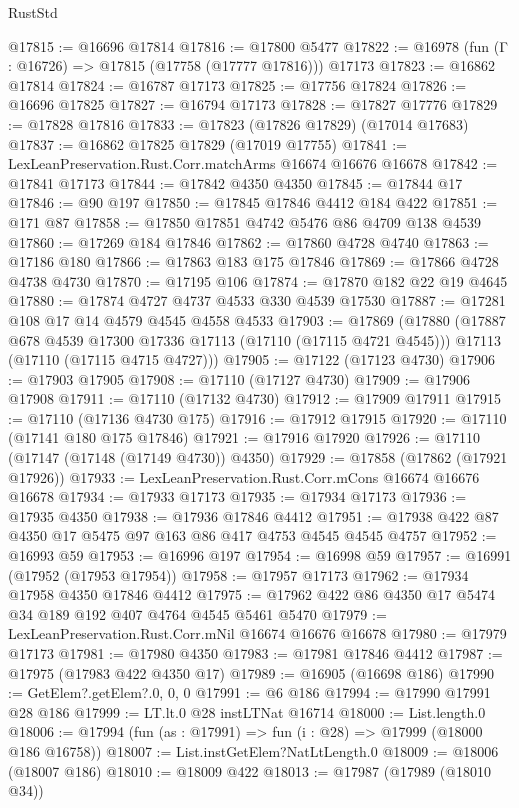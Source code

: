 \begin{lexlean}{RustStd}
\begin{coremodule}
@17815 := @16696 @17814
@17816 := @17800 @5477
@17822 := @16978 (fun (Γ : @16726) => @17815 (@17758 (@17777 @17816))) @17173
@17823 := @16862 @17814
@17824 := @16787 @17173
@17825 := @17756 @17824
@17826 := @16696 @17825
@17827 := @16794 @17173
@17828 := @17827 @17776
@17829 := @17828 @17816
@17833 := @17823 (@17826 @17829) (@17014 @17683)
@17837 := @16862 @17825 @17829 (@17019 @17755)
@17841 := LexLeanPreservation.Rust.Corr.matchArms @16674 @16676 @16678
@17842 := @17841 @17173
@17844 := @17842 @4350 @4350
@17845 := @17844 @17
@17846 := @90 @197
@17850 := @17845 @17846 @4412 @184 @422
@17851 := @171 @87
@17858 := @17850 @17851 @4742 @5476 @86 @4709 @138 @4539
@17860 := @17269 @184 @17846
@17862 := @17860 @4728 @4740
@17863 := @17186 @180
@17866 := @17863 @183 @175 @17846
@17869 := @17866 @4728 @4738 @4730
@17870 := @17195 @106
@17874 := @17870 @182 @22 @19 @4645
@17880 := @17874 @4727 @4737 @4533 @330 @4539 @17530
@17887 := @17281 @108 @17 @14 @4579 @4545 @4558 @4533
@17903 := @17869
    (@17880
      (@17887 @678 @4539 @17300 @17336 @17113 (@17110 (@17115 @4721 @4545)))
      @17113
      (@17110 (@17115 @4715 @4727)))
@17905 := @17122 (@17123 @4730)
@17906 := @17903 @17905
@17908 := @17110 (@17127 @4730)
@17909 := @17906 @17908
@17911 := @17110 (@17132 @4730)
@17912 := @17909 @17911
@17915 := @17110 (@17136 @4730 @175)
@17916 := @17912 @17915
@17920 := @17110 (@17141 @180 @175 @17846)
@17921 := @17916 @17920
@17926 := @17110 (@17147 (@17148 (@17149 @4730)) @4350)
@17929 := @17858 (@17862 (@17921 @17926))
@17933 := LexLeanPreservation.Rust.Corr.mCons @16674 @16676 @16678
@17934 := @17933 @17173
@17935 := @17934 @17173
@17936 := @17935 @4350
@17938 := @17936 @17846 @4412
@17951 := @17938 @422 @87 @4350 @17 @5475 @97 @163 @86 @417 @4753 @4545 @4545 @4757
@17952 := @16993 @59
@17953 := @16996 @197
@17954 := @16998 @59
@17957 := @16991 (@17952 (@17953 @17954))
@17958 := @17957 @17173
@17962 := @17934 @17958 @4350 @17846 @4412
@17975 := @17962 @422 @86 @4350 @17 @5474 @34 @189 @192 @407 @4764 @4545 @5461 @5470
@17979 := LexLeanPreservation.Rust.Corr.mNil @16674 @16676 @16678
@17980 := @17979 @17173
@17981 := @17980 @4350
@17983 := @17981 @17846 @4412
@17987 := @17975 (@17983 @422 @4350 @17)
@17989 := @16905 (@16698 @186)
@17990 := GetElem?.getElem?.{0, 0, 0}
@17991 := @6 @186
@17994 := @17990 @17991 @28 @186
@17999 := LT.lt.{0} @28 instLTNat @16714
@18000 := List.length.{0}
@18006 := @17994 (fun (as : @17991) => fun (i : @28) => @17999 (@18000 @186 @16758))
@18007 := List.instGetElem?NatLtLength.{0}
@18009 := @18006 (@18007 @186)
@18010 := @18009 @422
@18013 := @17987 (@17989 (@18010 @34))

\end{coremodule}
\end{lexlean}
